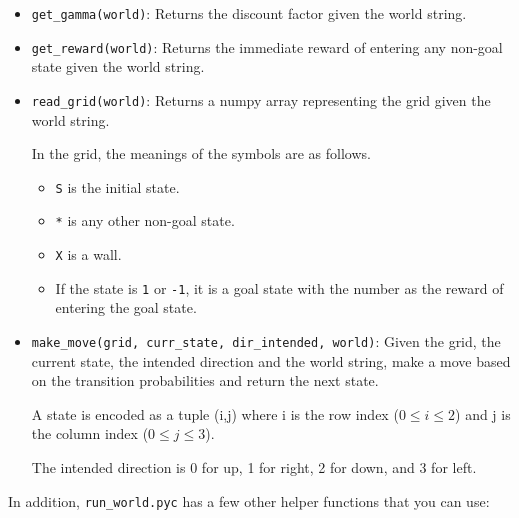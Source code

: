 \documentclass[12pt]{article}
\begin{document}
\begin{itemize}
\item \verb+get_gamma(world)+: Returns the discount factor given the world string. 

\item \verb+get_reward(world)+: Returns the immediate reward of entering any non-goal state given the world string. 

\item \verb+read_grid(world)+: Returns a numpy array representing the grid given the world string. 

In the grid, the meanings of the symbols are as follows.
\begin{itemize}
\item \verb+S+ is the initial state.
\item \verb+*+ is any other non-goal state.
\item \verb+X+ is a wall.
\item If the state is \verb+1+ or \verb+-1+, it is a goal state with the number as the reward of entering the goal state.
\end{itemize}

\item \verb+make_move(grid, curr_state, dir_intended, world)+:  Given the grid, the current state, the intended direction and the world string, make a move based on the transition probabilities and return the next state. 

A state is encoded as a tuple (i,j) where i is the row index ($0 \le i \le 2$) and j is the column index ($0 \le j \le 3$). 

The intended direction is 0 for up, 1 for right, 2 for down, and 3 for left.

\end{itemize}

In addition, \verb+run_world.pyc+ has a few other helper functions that you can use:
\end{document}

